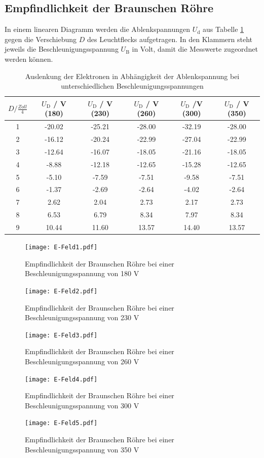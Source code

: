 \subsection{Empfindlichkeit der Braunschen Röhre}
In einem linearen Diagramm werden die Ablenkspannungen $U_\text{d}$ aus Tabelle \ref{tab:DIS} gegen die Verschiebung $D$ des Leuchtflecks aufgetragen. In den Klammern steht jeweils die Beschleunigungsspannung $U_\text{B}$ in Volt, damit die Messwerte zugeordnet werden können.
\begin{table}[H]
  \centering
  \begin{tabular}{c| c c c c c }
    \toprule
    $D / \frac{Zoll}{4}$ & $U_\text{D}$ / V (180) & $U_\text{D}$ / V (230) & $U_\text{D}$ / V (260) & $U_\text{D}$ /V (300) & $U_\text{D}$ / V (350) \\
    \midrule
    1 &	-20.02	&-25.21	&-28.00	&-32.19	&-28.00	\\
    2 &	-16.12	&-20.24	&-22.99	&-27.04	&-22.99	\\
    3 &	-12.64	&-16.07	&-18.05	&-21.16	&-18.05	\\
    4 &	-8.88	&-12.18	&-12.65	&-15.28	&-12.65	\\
    5 &	-5.10	&-7.59	&-7.51	&-9.58	&-7.51	\\
    6 &	-1.37	&-2.69	&-2.64	&-4.02	&-2.64	\\
    7 &	2.62	&2.04	&2.73	&2.17	&2.73	\\
    8 &	6.53	&6.79	&8.34	&7.97	&8.34	\\
    9 &	10.44	&11.60	&13.57	&14.40	&13.57	\\
    \bottomrule
  \end{tabular}
  \caption{Auslenkung der Elektronen in Abhängigkeit der Ablenkspannung bei unterschiedlichen Beschleunigungsspannungen}
  \label{tab:DIS}
\end{table}
\begin{figure}[H]
  \centering
  \texttt{[image: E-Feld1.pdf]}
  \caption{Empfindlichkeit der Braunschen Röhre bei einer Beschleunigungsspannung von 180 V}
  \label{fig:empf1}
\end{figure}
\begin{figure}[H]
  \centering
  \texttt{[image: E-Feld2.pdf]}
  \caption{Empfindlichkeit der Braunschen Röhre bei einer Beschleunigungsspannung von 230 V}
  \label{fig:empf2}
\end{figure}
\begin{figure}[H]
  \centering
  \texttt{[image: E-Feld3.pdf]}
  \caption{Empfindlichkeit der Braunschen Röhre bei einer Beschleunigungsspannung von 260 V}
  \label{fig:empf3}
\end{figure}
\begin{figure}[H]
  \centering
  \texttt{[image: E-Feld4.pdf]}
  \caption{Empfindlichkeit der Braunschen Röhre bei einer Beschleunigungsspannung von 300 V}
  \label{fig:empf4}
\end{figure}
\begin{figure}[H]
  \centering
  \texttt{[image: E-Feld5.pdf]}
  \caption{Empfindlichkeit der Braunschen Röhre bei einer Beschleunigungsspannung von 350 V}
  \label{fig:empf5}
\end{figure}


